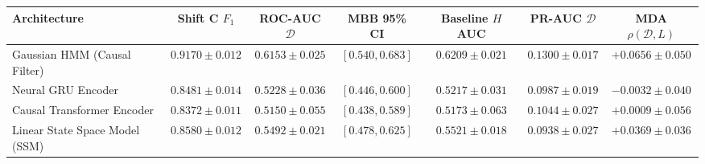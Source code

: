 \documentclass[twoside]{article}
\theoremstyle{definition}
\begin{document}
\begin{table}[!ht]
{\begin{tabular}{lcccccc}
\textbf{Architecture} & \textbf{Shift C $F_1$} & \textbf{ROC-AUC $\mathcal{D}$} & \textbf{MBB 95\% CI} & \textbf{Baseline $H$ AUC} & \textbf{PR-AUC $\mathcal{D}$} & \textbf{MDA $\rho(\mathcal{D}, L)$} \\
\midrule
Gaussian HMM (Causal Filter) & $\mathbf{0.9170} \pm 0.012$ & $\mathbf{0.6153} \pm 0.025$ & $[0.540, 0.683]$ & $0.6209 \pm 0.021$ & $\mathbf{0.1300} \pm 0.017$ & $\mathbf{+0.0656} \pm 0.050$ \\
Neural GRU Encoder & $0.8481 \pm 0.014$ & $0.5228 \pm 0.036$ & $[0.446, 0.600]$ & $0.5217 \pm 0.031$ & $0.0987 \pm 0.019$ & $-0.0032 \pm 0.040$ \\
Causal Transformer Encoder & $0.8372 \pm 0.011$ & $0.5150 \pm 0.055$ & $[0.438, 0.589]$ & $0.5173 \pm 0.063$ & $0.1044 \pm 0.027$ & $+0.0009 \pm 0.056$ \\
Linear State Space Model (SSM) & $0.8580 \pm 0.012$ & $0.5492 \pm 0.021$ & $[0.478, 0.625]$ & $0.5521 \pm 0.018$ & $0.0938 \pm 0.027$ & $+0.0369 \pm 0.036$ \\
\bottomrule
\end{tabular}%
}
\end{table}
\end{document}
